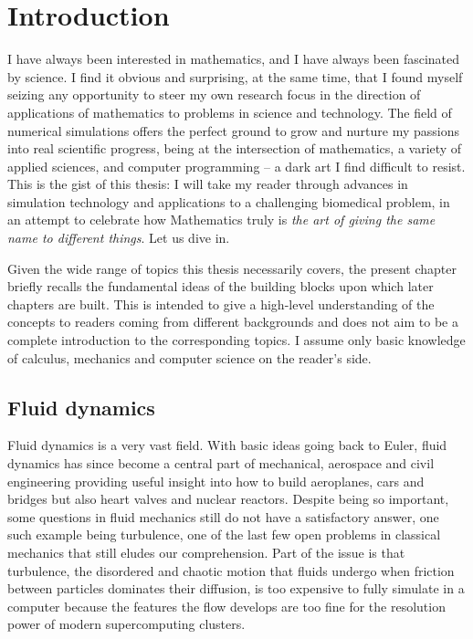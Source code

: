 \chapter{Introduction}
\label{cha_introduction}

I have always been interested in mathematics, and I have always been fascinated by science.
I find it obvious and surprising, at the same time, that I found myself seizing any opportunity to steer my own research focus in the direction of applications of mathematics to problems in science and technology.
The field of numerical simulations offers the perfect ground to grow and nurture my passions into real scientific progress, being at the intersection of mathematics, a variety of applied sciences, and computer programming -- a dark art I find difficult to resist.
This is the gist of this thesis: I will take my reader through advances in simulation technology and applications to a challenging biomedical problem, in an attempt to celebrate how Mathematics truly is \emph{the art of giving the same name to different things}.
Let us dive in.

Given the wide range of topics this thesis necessarily covers, the present
chapter briefly recalls the fundamental ideas of the building blocks
upon which later chapters are built.
This is intended to give a high-level understanding of the
concepts to readers coming from different backgrounds and does not aim
to be a complete introduction to the corresponding topics.
I assume only basic knowledge of calculus, mechanics and computer
science on the reader's side.

\section{Fluid dynamics}
\label{sec_cfd}
Fluid dynamics is a very vast field.
With basic ideas going back to Euler, fluid dynamics has since become a
central part of mechanical, aerospace and civil engineering providing
useful insight into how to build aeroplanes, cars and bridges but also
heart valves and nuclear reactors.
Despite being so important, some questions in fluid mechanics still do not
have a satisfactory answer, one such example being turbulence, one of the last few
open problems in classical mechanics that still eludes our
comprehension.
Part of the issue is that turbulence, the disordered and chaotic motion that fluids
undergo when friction between particles dominates their diffusion, is too
expensive to fully simulate in a computer because the features the flow
develops are too fine for the resolution power of modern supercomputing
clusters.

